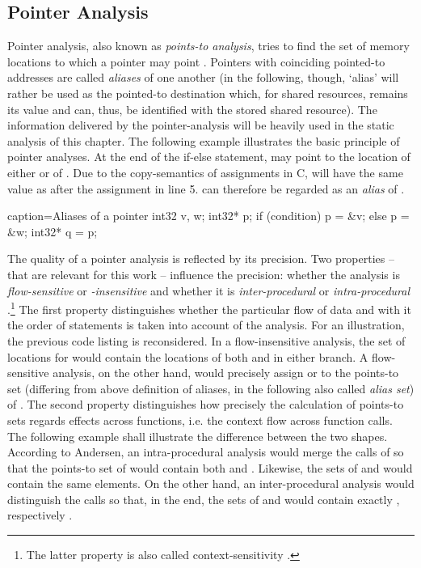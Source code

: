 \subsection{Pointer Analysis}
Pointer analysis, also known as \textit{points-to analysis}, tries to find the set of memory locations to which a pointer may point \cite{PointerAnalysisForStructuredParallelPrograms}. Pointers with coinciding pointed-to addresses are called \textit{aliases} of one another (in the following, though, `alias' will rather be used as the pointed-to destination which, for shared resources, remains its value and can, thus, be identified with the stored shared resource). The information delivered by the pointer-analysis will be heavily used in the static analysis of this chapter. The following example illustrates the basic principle of pointer analyses. At the end of the if-else statement,  may point to the location of either  or of . Due to the copy-semantics of assignments in C,  will have the same value as  after the assignment in line 5.  can therefore be regarded as an \textit{alias} of .
\begin{ccode}{caption=Aliases of a pointer}
int32 v, w;
int32* p;
if (condition)  p = &v;
else            p = &w; 
int32* q = p;
\end{ccode}
The quality of a pointer analysis is reflected by its precision. Two properties -- that are relevant for this work -- influence the precision: whether the analysis is \textit{flow-sensitive} or \textit{-insensitive} and whether it is \textit{inter-procedural} or \textit{intra-procedural} \cite{ProgramAnalysisAndSpecialization}.\footnote{The latter property is also called context-sensitivity \cite{CloningBasedContextSensitive}.} The first property distinguishes whether the particular flow of data and with it the order of statements is taken into account of the analysis. For an illustration, the previous code listing is reconsidered. In a flow-insensitive analysis, the set of locations for  would contain the locations of both  and  in either branch. A flow-sensitive analysis, on the other hand, would precisely assign  or  to the points-to set (differing from above definition of aliases, in the following also called \textit{alias set}) of . The second property distinguishes how precisely the calculation of points-to sets regards effects across functions, i.e. the context flow across function calls. The following example shall illustrate the difference between the two shapes. According to Andersen, an intra-procedural analysis would merge the calls of  so that the points-to set of  would contain both  and . Likewise, the sets of  and  would contain the same elements. On the other hand, an inter-procedural analysis would distinguish the calls so that, in the end, the sets of  and  would contain exactly , respectively .
